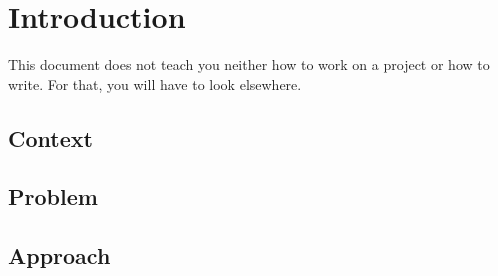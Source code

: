 \chapter{Introduction}

This document does not teach you neither how to work on a project or how to write. For that, you will have to look elsewhere\cite{reportwriting}.

\section{Context}
\section{Problem}
\section{Approach}

